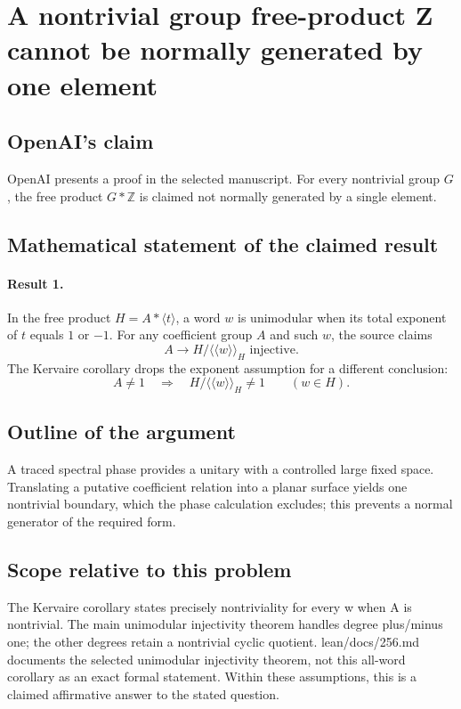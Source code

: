 \documentclass[11pt]{article}
\begin{document}
\section*{A nontrivial group free-product Z cannot be normally generated by one element}

\subsection{OpenAI's claim}
OpenAI presents a proof in the selected manuscript. For every nontrivial group $G$, the free product $G*\mathbb Z$ is claimed not normally generated by a single element.

\subsection{Mathematical statement of the claimed result}
\paragraph{Result 1.} In the free product \(H=A*\langle t\rangle\), a word \(w\) is unimodular when its total exponent of \(t\) equals \(1\) or \(-1\). For any coefficient group \(A\) and such \(w\), the source claims
\[
 A\longrightarrow H/\langle\!\langle w\rangle\!\rangle_H\text{ injective}.
\]
The Kervaire corollary drops the exponent assumption for a different conclusion:
\[
 A\ne1\quad\Longrightarrow\quad
 H/\langle\!\langle w\rangle\!\rangle_H\ne1\qquad(w\in H).
\]

\subsection{Outline of the argument}
A traced spectral phase provides a unitary with a controlled large fixed space. Translating a putative coefficient relation into a planar surface yields one nontrivial boundary, which the phase calculation excludes; this prevents a normal generator of the required form.

\subsection{Scope relative to this problem}
The Kervaire corollary states precisely nontriviality for every w when A is nontrivial. The main unimodular injectivity theorem handles degree plus/minus one; the other degrees retain a nontrivial cyclic quotient. lean/docs/256.md documents the selected unimodular injectivity theorem, not this all-word corollary as an exact formal statement. Within these assumptions, this is a claimed affirmative answer to the stated question.
\end{document}
